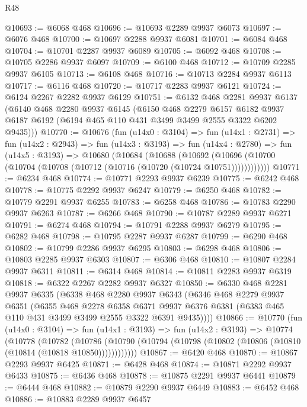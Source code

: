 \begin{lexlean}{R48}
\begin{coremodule}
@10693 := @6068 @468
@10696 := @10693 @2289 @9937 @6073
@10697 := @6076 @468
@10700 := @10697 @2288 @9937 @6081
@10701 := @6084 @468
@10704 := @10701 @2287 @9937 @6089
@10705 := @6092 @468
@10708 := @10705 @2286 @9937 @6097
@10709 := @6100 @468
@10712 := @10709 @2285 @9937 @6105
@10713 := @6108 @468
@10716 := @10713 @2284 @9937 @6113
@10717 := @6116 @468
@10720 := @10717 @2283 @9937 @6121
@10724 := @6124 @2267 @2282 @9937 @6129
@10751 := @6132
    @468
    @2281
    @9937
    @6137
    (@6140
      @468
      @2280
      @9937
      @6145
      (@6150
        @468
        @2279
        @6157
        @6182
        @9937
        @6187
        @6192
        (@6194 @465 @110 @431 @3499 @3499 @2555 @3322 @6202 @9435)))
@10770 := @10676
    (fun (u14x0 : @3104) =>
    fun (u14x1 : @2731) =>
    fun (u14x2 : @2943) =>
    fun (u14x3 : @3193) =>
    fun (u14x4 : @2780) =>
    fun (u14x5 : @3193) =>
    @10680
      (@10684
        (@10688
          (@10692 (@10696 (@10700 (@10704 (@10708 (@10712 (@10716 (@10720 (@10724 @10751))))))))))))
@10771 := @6234 @468
@10774 := @10771 @2293 @9937 @6239
@10775 := @6242 @468
@10778 := @10775 @2292 @9937 @6247
@10779 := @6250 @468
@10782 := @10779 @2291 @9937 @6255
@10783 := @6258 @468
@10786 := @10783 @2290 @9937 @6263
@10787 := @6266 @468
@10790 := @10787 @2289 @9937 @6271
@10791 := @6274 @468
@10794 := @10791 @2288 @9937 @6279
@10795 := @6282 @468
@10798 := @10795 @2287 @9937 @6287
@10799 := @6290 @468
@10802 := @10799 @2286 @9937 @6295
@10803 := @6298 @468
@10806 := @10803 @2285 @9937 @6303
@10807 := @6306 @468
@10810 := @10807 @2284 @9937 @6311
@10811 := @6314 @468
@10814 := @10811 @2283 @9937 @6319
@10818 := @6322 @2267 @2282 @9937 @6327
@10850 := @6330
    @468
    @2281
    @9937
    @6335
    (@6338
      @468
      @2280
      @9937
      @6343
      (@6346
        @468
        @2279
        @9937
        @6351
        (@6355
          @468
          @2278
          @6358
          @6371
          @9937
          @6376
          @6381
          (@6383 @465 @110 @431 @3499 @3499 @2555 @3322 @6391 @9435))))
@10866 := @10770
    (fun (u14x0 : @3104) =>
    fun (u14x1 : @3193) =>
    fun (u14x2 : @3193) =>
    @10774
      (@10778
        (@10782
          (@10786 (@10790 (@10794 (@10798 (@10802 (@10806 (@10810 (@10814 (@10818 @10850))))))))))))
@10867 := @6420 @468
@10870 := @10867 @2293 @9937 @6425
@10871 := @6428 @468
@10874 := @10871 @2292 @9937 @6433
@10875 := @6436 @468
@10878 := @10875 @2291 @9937 @6441
@10879 := @6444 @468
@10882 := @10879 @2290 @9937 @6449
@10883 := @6452 @468
@10886 := @10883 @2289 @9937 @6457

\end{coremodule}
\end{lexlean}
